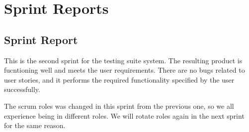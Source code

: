 
\chapter{Sprint Reports}

\section{Sprint Report}

This is the second sprint for the testing suite system. The resulting product is fucntioning well and meets the user requirements. There are no bugs related to user stories, and it performs the required functionality specified by the user successfully. 

The scrum roles was changed in this sprint from the previous one, so we all experience being in different roles. We will rotate roles again in the next sprint for the same reason. 

